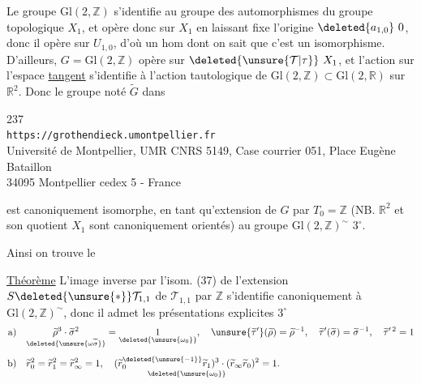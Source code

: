 Le groupe $\mathrm{Gl}(2,\mathbb Z)$ s'identifie au groupe des automorphismes du groupe topologique $X_1$, et opère donc sur $X_1$ en laissant fixe l'origine $\deleted{a_{1,0}}\ 0$, donc il opère sur $U_{1,0}$, d'où un hom
dont on sait que c'est un isomorphisme. D'ailleurs, $G=\mathrm{Gl}(2,\mathbb Z)$ opère  sur $\deleted{\unsure{\mathcal T|\tau}}\ X_1$, et l'action sur l'espace \uline{tangent} s'identifie à l'action tautologique de $\mathrm{Gl}(2,\mathbb Z)\subset\mathrm{Gl}(2,\mathbb R)$ sur $\mathbb R^2$. Donc le groupe noté $\widetilde G$ dans


\begin{center}
237\\
\texttt{https://grothendieck.umontpellier.fr}\\
Université de Montpellier, UMR CNRS 5149, Case courrier 051, Place Eugène Bataillon\\
34095 Montpellier cedex 5 - France
\end{center}

  est canoniquement isomorphe, en tant qu'extension de $G$ par $T_0=\mathbb Z$ (NB. $\mathbb R^2$ et son quotient $X_1$ sont canoniquement orientés) au groupe $\mathrm{Gl}(2,\mathbb Z)^\sim$  $3^\circ$.

Ainsi on trouve   le

\uline{Théorème} L'image inverse par l'isom. (37) de l'extension $S\deleted{\unsure{*}}\mathcal T_{1,1}$ de $\mathcal T_{1,1}$ par $\mathbb Z$ s'identifie canoniquement à $\mathrm{Gl}(2,\mathbb Z)^\sim$, donc il admet les  présentations explicites  $3^\circ$
\[
\begin{aligned}
\text{a)}\quad &
\underset{\deleted{\unsure{\omega\widetilde\sigma}}}{\widetilde\rho^{3}\cdot\widetilde\sigma^{2}}
=\underset{\deleted{\unsure{\omega_0}}}{1},\quad
\unsure{\widetilde\tau'}(\widetilde\rho)=\widetilde\rho^{-1},\quad
\widetilde\tau'(\widetilde\sigma)=\widetilde\sigma^{-1},\quad
\widetilde\tau'^{\,2}=1
\\[1ex]
\text{b)}\quad &
\widetilde r_0^{2}=\widetilde r_1^{2}=\widetilde r_\infty^{2}=1,\quad
\underset{\deleted{\unsure{\omega_0}}}{
(\widetilde r_0^{\deleted{\unsure{-1}}}\widetilde r_1)^3\cdot
(\widetilde r_\infty\widetilde r_0)^2}=1.
\end{aligned}
\]

